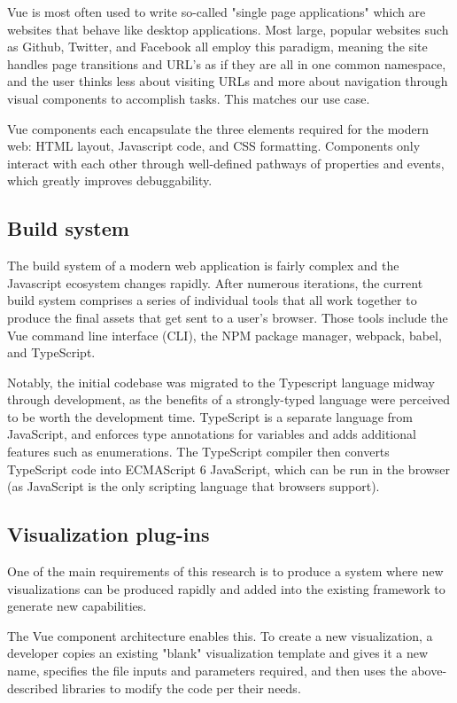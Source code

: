 \documentclass[Afour,sageh,times]{sagej}
\begin{document}
Vue is most often used to write so-called "single page applications" which are websites that behave like desktop applications. Most large, popular websites such as Github, Twitter, and Facebook all employ this paradigm, meaning the site handles page transitions and URL's as if they are all in one common namespace, and the user thinks less about visiting URLs and more about navigation through visual components to accomplish tasks. This matches our use case.

Vue components each encapsulate the three elements required for the modern web: HTML layout, Javascript code, and CSS formatting. Components only interact with each other through well-defined pathways of properties and events, which greatly improves debuggability.

\subsection{Build system}

The build system of a modern web application is fairly complex and the Javascript ecosystem changes rapidly. After numerous iterations, the current build system comprises a series of individual tools that all work together to produce the final assets that get sent to a user's browser. Those tools include the Vue command line interface (CLI), the NPM package manager, webpack, babel, and TypeScript.

Notably, the initial codebase was migrated to the Typescript language midway through development, as the benefits of a strongly-typed language were perceived to be worth the development time. TypeScript is a separate language from JavaScript, and enforces type annotations for variables and adds additional features such as enumerations. The TypeScript compiler then converts TypeScript code into ECMAScript 6 JavaScript, which can be run in the browser (as JavaScript is the only scripting language that browsers support).

\subsection{Visualization plug-ins}

One of the main requirements of this research is to produce a system where new visualizations can be produced rapidly and added into the existing framework to generate new capabilities.

The Vue component architecture enables this. To create a new visualization, a developer copies an existing "blank" visualization template and gives it a new name, specifies the file inputs and parameters required, and then uses the above-described libraries to modify the code per their needs.
\end{document}

